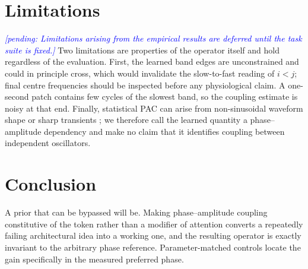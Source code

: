 \documentclass{article}
\newcommand{\pending}[1]{\textcolor{blue}{\textit{[pending: #1]}}}
\begin{document}
\section{Limitations}

\pending{Limitations arising from the empirical results are deferred until the
task suite is fixed.} Two limitations are properties of the operator itself and
hold regardless of the evaluation. First, the
learned band edges are unconstrained and could in principle cross, which would
invalidate the slow-to-fast reading of $i<j$; final centre frequencies should be
inspected before any physiological claim. A one-second patch contains few cycles
of the slowest band, so the coupling estimate is noisy at that end. Finally,
statistical PAC can arise from non-sinusoidal waveform shape or sharp transients
\citep{kramer2008spurious,cole2017waveform,aru2015untangling}; we therefore call
the learned quantity a phase--amplitude dependency and make no claim that it
identifies coupling between independent oscillators.

\section{Conclusion}

A prior that can be bypassed will be. Making phase--amplitude coupling
constitutive of the token rather than a modifier of attention converts a
repeatedly failing architectural idea into a working one, and the resulting
operator is exactly invariant to the arbitrary phase reference. Parameter-matched
controls locate the gain specifically in the measured preferred phase.



\end{document}
